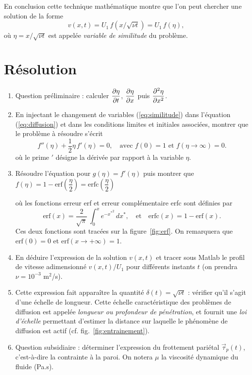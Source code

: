 \documentclass[10pt, a4paper]{article}
\renewcommand{\myvec}[1]{\vec{#1}}
\begin{document}
\noindent
En conclusion cette technique mathématique montre que l'on peut chercher une solution de la forme
\begin{equation}
	v(x, t) = U_1\, f(x/\sqrt{\nu t}) = U_1 \, f(\eta),
	\label{eq:similitude}
\end{equation}
où $\eta = x/\sqrt{\nu t}$ est appelée \textsl{variable de similitude} du problème. 

\section{Résolution}

\begin{enumerate}
\item
	Question préliminaire : calculer $\displaystyle \frac{\partial \eta}{\partial t}$, $\displaystyle \frac{\partial \eta}{\partial x}$ puis $\displaystyle \frac{\partial^2 \eta}{\partial x^2}$.
\item
	En injectant le changement de variables (\ref{eq:similitude}) dans l'équation (\ref{eq:diffusion}) et dans
	les conditions limites et initiales associées, montrer que le problème à résoudre s'écrit
	\begin{equation}
		f''(\eta) + \frac{1}{2}\eta \, f'(\eta) = 0, \quad \mbox{avec $f(0) = 1$ et $f(\eta\rightarrow \infty) = 0$.}
	\end{equation}
	où le prime $'$ désigne la dérivée par rapport à la variable $\eta$.
\item
	Résoudre l'équation pour $g(\eta) = f'(\eta)$ puis montrer que 
	$
		f(\eta) = 1 - \mbox{erf}\left ( \dfrac{\eta}{2}\right ) = \mbox{erfc}\left ( \dfrac{\eta}{2}\right )
	$
	
	où les fonctions erreur \mbox{erf} et erreur complémentaire \mbox{erfc} sont définies par
	\[
		\mbox{erf}(x) = \frac{2}{\sqrt{\pi}} \, \int_0^x e^{-{x^*}^2}\, dx^*, 
		\quad \mbox{et} \quad \mbox{erfc}(x) = 1 - \mbox{erf}(x).
	\]
	Ces deux fonctions sont tracées sur la figure~\ref{fig:erf}.
	On remarquera que $\mbox{erf}(0) = 0$ et $\mbox{erf}(x\rightarrow +\infty) = 1$.
\item
	En déduire l'expression de la solution $v(x, t)$ et tracer sous Matlab le profil de vitesse adimensionné $v(x, t)/U_1$
	pour différents instants $t$ (on prendra $\nu = 10^{-3}$ m$^2$/s).
\item
	Cette expression fait apparaître la quantité $\delta(t) = \sqrt{\nu t}$ : vérifier qu'il s'agit d'une échelle de longueur.
	Cette échelle caractéristique des problèmes de diffusion est appelée \textsl{longueur ou profondeur de pénétration}, 
	et fournit une \textsl{loi d'échelle} permettant d'estimer la distance sur laquelle le phénomène de diffusion est actif 
	(cf. fig.~\ref{fig:entrainement}).
\item
	Question subsidiaire : déterminer l'expression du frottement pariétal $\myvec{\tau}_p(t)$, 
	c'est-à-dire la contrainte à la paroi.
	On notera $\mu$ la viscosité dynamique du fluide (Pa.s).
\end{enumerate}
\end{document}
